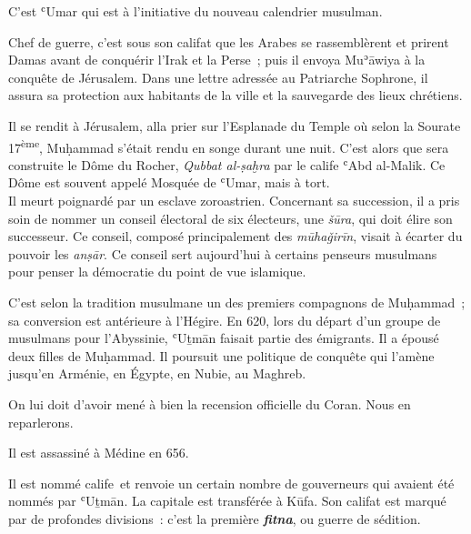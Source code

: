 C'est ʿUmar qui est à l'initiative du nouveau calendrier musulman.

Chef de guerre, c'est sous son califat que les Arabes se rassemblèrent
et prirent Damas avant de conquérir l'Irak et la Perse~; puis il envoya
Muʾāwiya à la conquête de Jérusalem. Dans une lettre adressée au
Patriarche Sophrone, il assura sa protection aux habitants de la ville
et la sauvegarde des lieux chrétiens.

Il se rendit à Jérusalem, alla prier sur l'Esplanade du Temple où selon
la Sourate 17\textsuperscript{ème}, Muḥammad s'était rendu en songe
durant une nuit. C'est alors que sera construite le Dôme du Rocher,
\emph{Qubbat al-ṣaḫra} par le calife ʿAbd al-Malik. Ce Dôme est souvent
appelé Mosquée de ʿUmar, mais à tort. \\


Il meurt poignardé par un esclave zoroastrien. Concernant sa succession,
il a pris soin de nommer un conseil électoral de six électeurs, une
\emph{šūra}, qui doit élire son successeur. Ce conseil, composé
principalement des \emph{mūhaǧirīn}, visait à écarter du pouvoir les
\emph{anṣār}. Ce conseil sert aujourd'hui à certains penseurs musulmans
pour penser la démocratie du point de vue islamique.


C'est selon la tradition musulmane un des premiers compagnons de
Muḥammad~; sa conversion est antérieure à l'Hégire. En 620, lors du
départ d'un groupe de musulmans pour l'Abyssinie, ʿUṯmān faisait partie
des émigrants. Il a épousé deux filles de Muḥammad. Il poursuit une
politique de conquête qui l'amène jusqu'en Arménie, en Égypte, en Nubie,
au Maghreb.

On lui doit d'avoir mené à bien la recension officielle du Coran. Nous
en reparlerons.

Il est assassiné à Médine en 656.


Il est nommé calife~et renvoie un certain nombre de gouverneurs qui
avaient été nommés par ʿUṯmān. La capitale est transférée à Kūfa. Son
califat est marqué par de profondes divisions~: c'est la première
\emph{\textbf{fitna}}, ou guerre de sédition.

